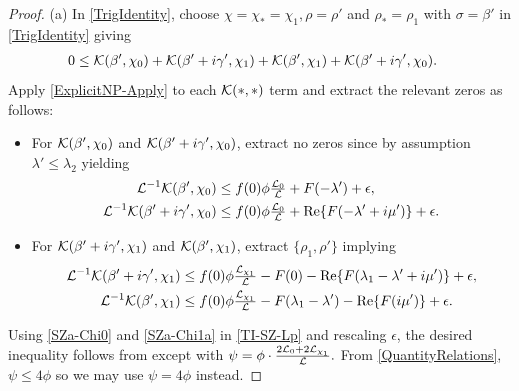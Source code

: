 \documentclass[12pt,psamsfonts]{amsart}
\theoremstyle{definition}
\theoremstyle{remark}
\numberwithin{equation}{section}
\begin{document}
\begin{proof} (a) In \eqref{TrigIdentity}, choose $\chi = \chi_* =  \chi_1, \rho = \rho'$ and $\rho_* = \rho_1$ with $\sigma = \beta'$ in \eqref{TrigIdentity} giving
\begin{equation}
\begin{aligned}
0 & \leq \mathcal{K}(\beta', \chi_0)  + \mathcal{K}(\beta'+ i\gamma', \chi_1) + \mathcal{K}(\beta', \chi_1)  + \mathcal{K}(\beta'+ i\gamma', \chi_0).
\end{aligned}
\label{TI-SZ-Lp}
\end{equation}
Apply \cref{ExplicitNP-Apply} to each $\mathcal{K}(\ast, \ast)$ term and extract the relevant zeros as follows:
\begin{itemize}
	\item For $\mathcal{K}(\beta', \chi_0)$ and $\mathcal{K}(\beta'+i\gamma', \chi_0)$, extract no zeros since by assumption $\lambda' \leq \lambda_2$ yielding
\begin{equation}
\begin{aligned}
\mathcal{L}^{-1} \mathcal{K}(\beta', \chi_0)  & \leq f(0)\phi \tfrac{\mathcal{L}_0}{\mathcal{L}}   + F(-\lambda')+ \epsilon, \\
\mathcal{L}^{-1} \mathcal{K}(\beta'+i\gamma', \chi_0) & \leq f(0)  \phi \tfrac{\mathcal{L}_0}{\mathcal{L}}   + \mathrm{Re}\{ F(-\lambda' + i\mu')\}+ \epsilon.
\label{SZa-Chi0}
\end{aligned}
\end{equation}


 \item For $\mathcal{K}(\beta'+i\gamma', \chi_1)$ and $\mathcal{K}(\beta', \chi_1)$, extract $\{ \rho_1, \rho'\}$ implying
\begin{equation}
\begin{aligned}
\mathcal{L}^{-1} \mathcal{K}(\beta'+i\gamma', \chi_1) &  \leq f(0) \phi \tfrac{\mathcal{L}_{\chi_1}}{\mathcal{L}}  - F(0) - \mathrm{Re}\{F(\lambda_1-\lambda' + i\mu')\}+ \epsilon, \\
\mathcal{L}^{-1} \mathcal{K}(\beta', \chi_1) &  \leq f(0) \phi \tfrac{\mathcal{L}_{\chi_1}}{\mathcal{L}}  - F(\lambda_1-\lambda') - \mathrm{Re}\{F(i\mu')\}+ \epsilon. 
\end{aligned}
\label{SZa-Chi1a}
\end{equation}
\end{itemize}
Using \eqref{SZa-Chi0} and \eqref{SZa-Chi1a} in \eqref{TI-SZ-Lp}  and rescaling $\epsilon$,  the desired inequality follows from  except with  $\psi = \phi \cdot \tfrac{2\mathcal{L}_0 + 2\mathcal{L}_{\chi_1}}{\mathcal{L}}.$ From \cref{QuantityRelations},  $\psi \leq 4\phi$ so we may use $\psi = 4\phi$ instead. 


\end{proof}
\end{document}
